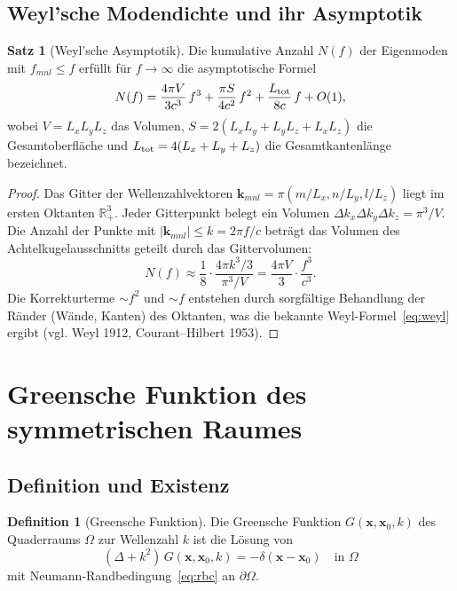 ﻿\documentclass[12pt, a4paper]{article}
\theoremstyle{definition}
\newtheorem{definition}{Definition}[section]
\newtheorem{satz}{Satz}[section]
\theoremstyle{remark}
\newcommand{\R}{\mathbb{R}}
\newcommand{\Lx}{L_x}
\newcommand{\Ly}{L_y}
\newcommand{\Lz}{L_z}
\begin{document}
\subsection{Weyl'sche Modendichte und ihr Asymptotik}

\begin{satz}[Weyl'sche Asymptotik]
\label{satz:weyl}
Die kumulative Anzahl $N(f)$ der Eigenmoden mit $f_{mnl} \leq f$ erfüllt
für $f \to \infty$ die asymptotische Formel
\begin{equation}
  N(f) = \frac{4\pi V}{3c^3}\,f^3 + \frac{\pi S}{4c^2}\,f^2 + \frac{L_{\rm tot}}{8c}\,f + O(1),
  \label{eq:weyl}
\end{equation}
wobei $V = \Lx\Ly\Lz$ das Volumen, $S = 2(\Lx\Ly + \Ly\Lz + \Lx\Lz)$
die Gesamtoberfläche und $L_{\rm tot} = 4(\Lx+\Ly+\Lz)$ die Gesamtkantenlänge bezeichnet.
\end{satz}

\begin{proof}
Das Gitter der Wellenzahlvektoren $\mathbf{k}_{mnl} = \pi(m/\Lx, n/\Ly, l/\Lz)$
liegt im ersten Oktanten $\R^3_+$. Jeder Gitterpunkt belegt ein Volumen
$\Delta k_x \Delta k_y \Delta k_z = \pi^3/V$.
Die Anzahl der Punkte mit $|\mathbf{k}_{mnl}| \leq k = 2\pi f/c$ beträgt
das Volumen des Achtelkugelausschnitts geteilt durch das Gittervolumen:
\[
  N(f) \approx \frac{1}{8} \cdot \frac{4\pi k^3/3}{\pi^3/V}
  = \frac{4\pi V}{3} \cdot \frac{f^3}{c^3}.
\]
Die Korrekturterme $\sim f^2$ und $\sim f$ entstehen durch sorgfältige
Behandlung der Ränder (Wände, Kanten) des Oktanten, was die bekannte
Weyl-Formel~\eqref{eq:weyl} ergibt (vgl. Weyl 1912, Courant--Hilbert 1953). 
\end{proof}

\section{Greensche Funktion des symmetrischen Raumes}
\label{sec:greens}

\subsection{Definition und Existenz}

\begin{definition}[Greensche Funktion]
Die Greensche Funktion $G(\mathbf{x}, \mathbf{x}_0, k)$ des Quaderraums
$\Omega$ zur Wellenzahl $k$ ist die Lösung von
\begin{equation}
  (\Delta + k^2)\,G(\mathbf{x},\mathbf{x}_0,k) = -\delta(\mathbf{x}-\mathbf{x}_0)
  \quad \text{in } \Omega
  \label{eq:greens_dgl}
\end{equation}
mit Neumann-Randbedingung~\eqref{eq:rbc} an $\partial\Omega$.
\end{definition}
\end{document}
